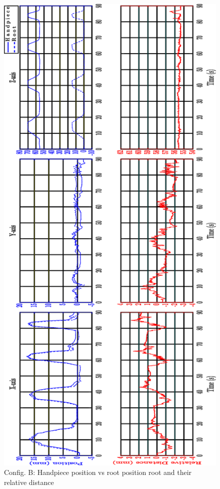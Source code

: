 \begin{figure}[htbp]
\begin{center}
\includegraphics[width=0.7\linewidth]{Images/exp/ConfigB_1.eps}
\caption{Config. B: Handpiece position vs root position root and their relative distance}
\label{fig: exp1_2_1}
\end{center}
\end{figure}	
			
